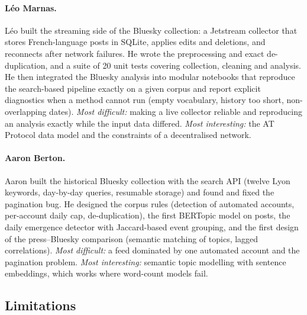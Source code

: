 \documentclass[pdflatex,sn-mathphys-num]{sn-jnl}
\begin{document}
\paragraph{L\'eo Marnas.} L\'eo built the streaming side of the Bluesky collection: a Jetstream collector that stores French-language posts in SQLite, applies edits and deletions, and reconnects after network failures. He wrote the preprocessing and exact de-duplication, and a suite of 20 unit tests covering collection, cleaning and analysis. He then integrated the Bluesky analysis into modular notebooks that reproduce the search-based pipeline exactly on a given corpus and report explicit diagnostics when a method cannot run (empty vocabulary, history too short, non-overlapping dates). \emph{Most difficult:} making a live collector reliable and reproducing an analysis exactly while the input data differed. \emph{Most interesting:} the AT Protocol data model and the constraints of a decentralised network.

\paragraph{Aaron Berton.} Aaron built the historical Bluesky collection with the search API (twelve Lyon keywords, day-by-day queries, resumable storage) and found and fixed the pagination bug. He designed the corpus rules (detection of automated accounts, per-account daily cap, de-duplication), the first BERTopic model on posts, the daily emergence detector with Jaccard-based event grouping, and the first design of the press--Bluesky comparison (semantic matching of topics, lagged correlations). \emph{Most difficult:} a feed dominated by one automated account and the pagination problem. \emph{Most interesting:} semantic topic modelling with sentence embeddings, which works where word-count models fail.

\subsection*{Limitations}
\end{document}
